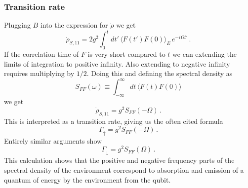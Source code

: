 \subsubsection{Transition rate}

Plugging $B$ into the expression for $\dot{\rho}$ we get
\begin{equation}
\dot{\rho}_{S,11} =
2 g^2 \int_0^t dt' \, \langle F(t') F(0) \rangle_E \, e^{-i \Omega t'} \, .
\end{equation}
If the correlation time of $F$ is very short compared to $t$ we can extending the limits of integration to positive infinity.
Also extending to negative infinity requires multiplying by $1/2$.
Doing this and defining the spectral density as
\begin{equation}
S_{FF}(\omega) \equiv \int_{-\infty}^\infty dt \, \langle F(t) F(0) \rangle
\end{equation}
we get
\begin{equation}
\dot{\rho}_{S,11} = g^2 S_{FF}(-\Omega) \, .
\end{equation}
This is interpreted as a transition rate, giving us the often cited formula
\begin{equation}
\Gamma_\uparrow = g^2 S_{FF}(-\Omega) \, .
\end{equation}
Entirely similar arguments show
\begin{equation}
\Gamma_\downarrow = g^2 S_{FF}(\Omega) \, .
\end{equation}
This calculation shows that the positive and negative frequency parts of the spectral density of the environment correspond to absorption and emission of a quantum of energy by the environment from the qubit.
